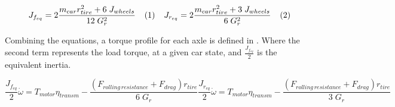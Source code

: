 \vspace{0.5cm}
\begin{subequations}
	\centering
	\begin{minipage}{.47\linewidth}
		\begin{equation}
			J_{f_{eq}} = 2\frac{m_{car}r_{tire}^2 + 6\;J_{wheels}}{12\;G_r^2}
			\label{eq:motor_iner_equivalent_front}
		\end{equation}
	\end{minipage}
	\begin{minipage}{.47\linewidth}
		\begin{equation}
			J_{r_{eq}} = 2\frac{m_{car}r_{tire}^2 + 3\;J_{wheels}}{6\;G_r^2}
			\label{eq:motor_iner_equivalent_rear}
		\end{equation}
	\end{minipage}
	\label{eq:motor_iner_equivalent}
\end{subequations}
\vspace{0.5cm}

Combining the equations, a torque profile for each axle is defined in . Where the second term represents the load torque, at a given car state, and $\frac{J_{f_{eq}}}{2}$ is the equivalent inertia.

\begin{subequations}
	\begin{equation}
		\frac{J_{f_{eq}}}{2}\dot{\omega} = T_{motor}\eta_{transm}  - \frac{\left(F_{rolling\,resistance}+F_{drag}\right)r_{tire}}{6\;G_r}
	\end{equation}
	\begin{equation}
		\frac{J_{r_{eq}}}{2}\dot{\omega} = T_{motor}\eta_{transm}  - \frac{\left(F_{rolling\,resistance}+F_{drag}\right)r_{tire}}{3\;G_r}
	\end{equation}
	\label{eq:load_profile}
\end{subequations}